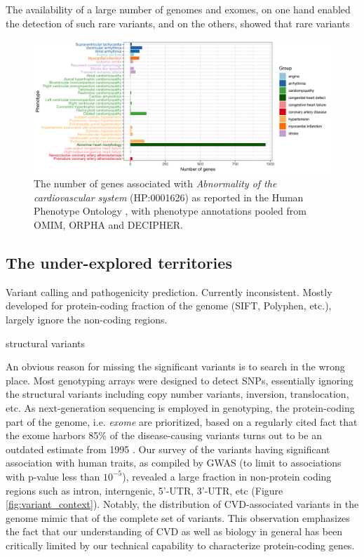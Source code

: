 \documentclass[letter]{bioinfo}
\begin{document}
The availability of a large number of genomes and exomes, on one hand enabled the detection of such rare variants, and on the others,  showed that rare variants 


\begin{figure}[!tpb]
	\includegraphics[width=1.\linewidth]{hpo-gene-count}
	\caption{The number of genes associated with \textit{Abnormality of the cardiovascular system} (HP:0001626) as reported in the Human Phenotype Ontology \citep{Kohler:2014:Human}, with phenotype annotations pooled from OMIM, ORPHA and DECIPHER.}
	\label{fig:hpo_gene_count}	
\end{figure}

\subsection{The under-explored territories}


Variant calling and pathogenicity prediction. Currently inconsistent. Mostly developed for protein-coding fraction of the genome (SIFT, Polyphen, etc.), largely ignore the non-coding regions.

structural variants

An obvious reason for missing the significant variants is to search in the wrong place. Most genotyping arrays were designed to detect SNPs, essentially ignoring the structural variants including copy number variants, inversion, translocation, etc. As next-generation sequencing is employed in genotyping, the protein-coding part of the genome, i.e. \textit{exome} are prioritized, based on a regularly cited fact that the exome harbors 85\% of the disease-causing variants turns out to be an outdated estimate from 1995 \citep{Antonarakis:2001:nature}. Our survey of the variants having significant association with human traits, as compiled by GWAS (to limit to associations with p-value less than $10^{-5}$), revealed a large fraction in non-protein coding regions such as intron, interngenic, 5'-UTR, 3'-UTR, etc (Figure \ref{fig:variant_context}). Notably, the distribution of CVD-associated variants in the genome mimic that of the complete set of variants. This observation emphasizes the fact that our understanding of CVD as well as biology in general has been critically limited by our technical capability to characterize protein-coding genes. 
\end{document}
